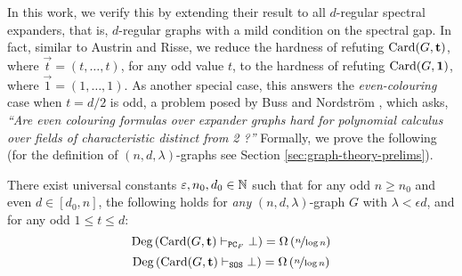 \documentclass[11pt]{article}
\providecommand{\DIFadd}[1]{\textcolor{shin-ryoku}{#1}}%
\providecommand{\DIFaddbegin}{} %
\providecommand{\DIFaddend}{} %
\begin{document}
In this work, we verify this by extending their result to all $d$-regular spectral expanders, that is, $d$-regular graphs with a mild condition on the spectral gap.
In fact, similar to Austrin and Risse, we reduce the hardness of refuting $\text{Card}(G, \mathbf{t})$, \DIFaddbegin \DIFadd{where $\vec{t} = (t, \ldots, t)$, }\DIFaddend for any odd value $t$, to the hardness of refuting $\text{Card}(G, \mathbf{1})$\DIFaddbegin \DIFadd{, where $\vec{1} = (1, \ldots, 1)$}\DIFaddend .
As another special case, this answers the \emph{even-colouring} case when $t = d/2$ is odd, a problem posed by Buss and Nordstr\"{o}m \citep[Open Problem 7.7]{buss2021proof}, which asks, \textit{``Are even colouring formulas over expander graphs hard for polynomial calculus over fields of characteristic distinct from 2 ?''}
Formally, we prove the following (for the definition of $(n, d, \lambda)$-graphs see Section \ref{sec:graph-theory-prelims}).


\begin{theorem}\label{thm:general-hardness-result}

  There exist universal constants $\varepsilon, n_0, d_0 \in \mathbb{N}$ such that for any odd $n \ge n_0$ and even $d \in [d_0, n]$, the following holds for \emph{any} $(n, d, \lambda)$-graph $G$ with $\lambda < \epsilon d$, and for any odd $1 \leq t \leq d$:  
  \[ \text{Deg}\left(\text{Card}(G, \mathbf{t}) \vdash_{\texttt{PC}_F} \bot\right) = \Omega\left(\nicefrac{n}{\log n}\right)\]
  \[ \text{Deg}\left(\text{Card}(G, \mathbf{t}) \vdash_{\texttt{SOS}} \bot\right) = \Omega\left(\nicefrac{n}{\log n}\right)\]  
\end{theorem}
\end{document}
